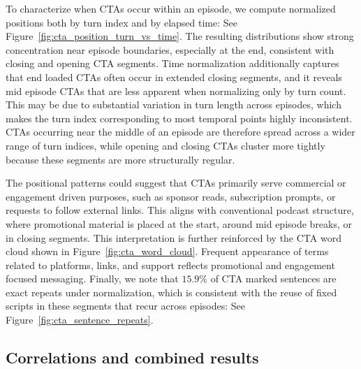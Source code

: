 \documentclass{article}
\begin{document}
To characterize when CTAs occur within an episode, we compute normalized positions both by turn index and by elapsed time: See Figure~\ref{fig:cta_position_turn_vs_time}. The resulting distributions show strong concentration near episode boundaries, especially at the end, consistent with closing and opening CTA segments. Time normalization additionally captures that end loaded CTAs often occur in extended closing segments, and it reveals mid episode CTAs that are less apparent when normalizing only by turn count. This may be due to substantial variation in turn length across episodes, which makes the turn index corresponding to most temporal points highly inconsistent. CTAs occurring near the middle of an episode are therefore spread across a wider range of turn indices, while opening and closing CTAs cluster more tightly because these segments are more structurally regular.

The positional patterns could suggest that CTAs primarily serve commercial or engagement driven purposes, such as sponsor reads, subscription prompts, or requests to follow external links. This aligns with conventional podcast structure, where promotional material is placed at the start, around mid episode breaks, or in closing segments. This interpretation is further reinforced by the CTA word cloud shown in Figure~\ref{fig:cta_word_cloud}. Frequent appearance of terms related to platforms, links, and support reflects promotional and engagement focused messaging. Finally, we note that $15.9\%$ of CTA marked sentences are exact repeats under normalization, which is consistent with the reuse of fixed scripts in these segments that recur across episodes: See Figure~\ref{fig:cta_sentence_repeats}.

\subsection{Correlations and combined results}
\end{document}
